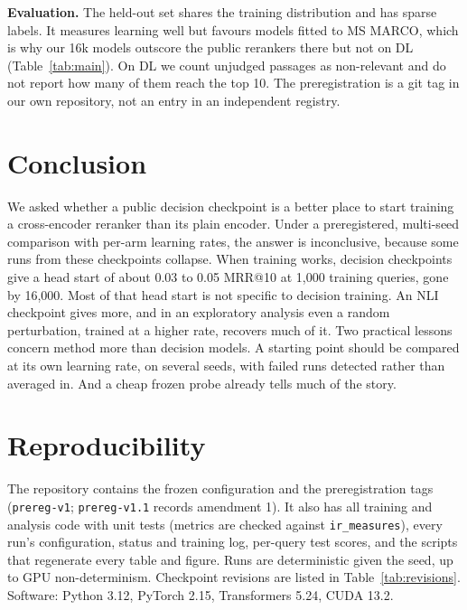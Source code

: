 \documentclass[journal]{IEEEtran}
\makeatletter
\newcommand{\ms}{MRR@10}
\makeatother
\begin{document}
\textbf{Evaluation.} The held-out set shares the training distribution and has sparse labels. It measures learning well but favours models fitted to MS MARCO, which is why our 16k models outscore the public rerankers there but not on DL (Table~\ref{tab:main}). On DL we count unjudged passages as non-relevant and do not report how many of them reach the top 10. The preregistration is a git tag in our own repository, not an entry in an independent registry.

\section{Conclusion}

We asked whether a public decision checkpoint is a better place to start training a cross-encoder reranker than its plain encoder. Under a preregistered, multi-seed comparison with per-arm learning rates, the answer is inconclusive, because some runs from these checkpoints collapse. When training works, decision checkpoints give a head start of about 0.03 to 0.05 \ms{} at 1{,}000 training queries, gone by 16{,}000. Most of that head start is not specific to decision training. An NLI checkpoint gives more, and in an exploratory analysis even a random perturbation, trained at a higher rate, recovers much of it. Two practical lessons concern method more than decision models. A starting point should be compared at its own learning rate, on several seeds, with failed runs detected rather than averaged in. And a cheap frozen probe already tells much of the story.

\section*{Reproducibility}

The repository contains the frozen configuration and the preregistration tags (\texttt{prereg-v1}; \texttt{prereg-v1.1} records amendment 1). It also has all training and analysis code with unit tests (metrics are checked against \texttt{ir\_measures}), every run's configuration, status and training log, per-query test scores, and the scripts that regenerate every table and figure. Runs are deterministic given the seed, up to GPU non-determinism. Checkpoint revisions are listed in Table~\ref{tab:revisions}. Software: Python 3.12, PyTorch 2.15, Transformers 5.24, CUDA 13.2.
\end{document}
